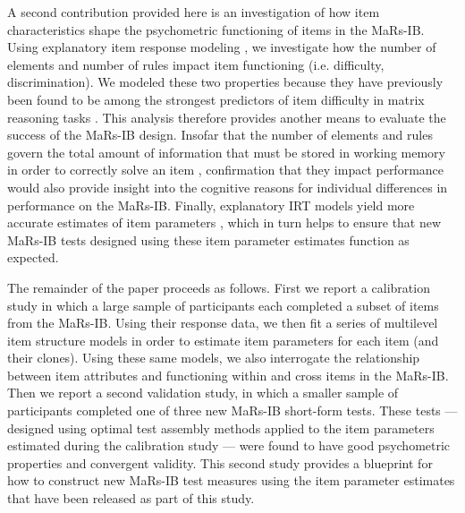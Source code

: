\documentclass[a4paper,man,natbib]{apa6}
\begin{document}
A second contribution provided here is an investigation of how item characteristics shape the psychometric functioning of items in the MaRs-IB. Using explanatory item response modeling \citep{de2004explanatory, wilson2008explanatory}, we investigate how the number of elements and number of rules impact item functioning (i.e. difficulty, discrimination). We modeled these two properties because they have previously been found to be among the strongest predictors of item difficulty in matrix reasoning tasks \citep{carpenter1990one, embretson1998cognitive}. This analysis therefore provides another means to evaluate the success of the MaRs-IB design. Insofar that the number of elements and rules govern the total amount of information that must be stored in working memory in order to correctly solve an item \citep{embretson1998cognitive}, confirmation that they impact performance would also provide insight into the cognitive reasons for individual differences in performance on the MaRs-IB. Finally, explanatory IRT models yield more accurate estimates of item parameters \citep{neuhaus2006separating}, which in turn helps to ensure that new MaRs-IB tests designed using these item parameter estimates function as expected.


The remainder of the paper proceeds as follows. First we report a calibration study in which a large sample of participants each completed a subset of items from the MaRs-IB. Using their response data, we then fit a series of multilevel item structure models in order to estimate item parameters for each item (and their clones). Using these same models, we also interrogate the relationship between item attributes and functioning within and cross items in the MaRs-IB. Then we report a second validation study, in which a smaller sample of participants completed one of three new MaRs-IB short-form tests. These tests --- designed using optimal test assembly methods applied to the item parameters estimated during the calibration study --- were found to have good psychometric properties and convergent validity. This second study provides a blueprint for how to construct new MaRs-IB test measures using the item parameter estimates that have been released as part of this study.
\end{document}
